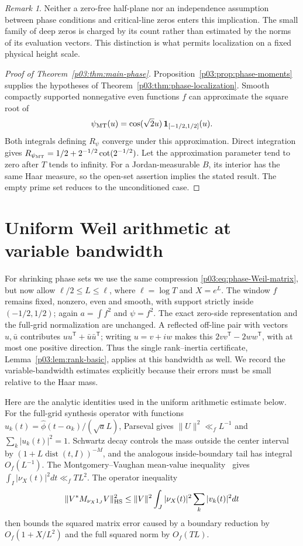 \documentclass[11pt,letterpaper]{article}
\theoremstyle{definition}
\theoremstyle{remark}
\newtheorem{remark}[theorem]{Remark}
\newcommand{\1}{\mathbf 1}
\begin{document}
\begin{remark}
Neither a zero-free half-plane nor an independence assumption between
phase conditions and critical-line zeros enters this implication.
The small family of deep zeros is charged by its count rather than
estimated by the norms of its evaluation vectors.  This distinction
is what permits localization on a fixed physical height scale.
\end{remark}

\begin{proof}[Proof of Theorem~\ref{p03:thm:main-phase}]
Proposition~\ref{p03:prop:phase-moments} supplies the hypotheses of
Theorem~\ref{p03:thm:phase-localization}. Smooth compactly supported
nonnegative even functions $f$ can approximate the square root of
\[
 \psi_{\rm MT}(u)=\cos(\sqrt2u)\,\mathbf1_{[-1/2,1/2]}(u).
\]
Both integrals defining $R_\psi$ converge under this approximation.
Direct integration gives
$R_{\psi_{\rm MT}}=1/2+2^{-1/2}\cot(2^{-1/2})$.
Let the approximation parameter tend to zero after $T$ tends to
infinity. For a Jordan-measurable $B$, its interior has the same
Haar measure, so the open-set assertion implies the stated result.
The empty prime set reduces to the unconditioned case.
\end{proof}




\section{Uniform Weil arithmetic at variable bandwidth}
\label{p04:sec:basic-Weil}

For shrinking phase sets we use the same compression
\eqref{p03:eq:phase-Weil-matrix}, but now allow
$\ell/2\le L\le\ell$, where $\ell=\log T$ and $X=e^L$.
The window $f$ remains fixed, nonzero, even and smooth, with support
strictly inside $(-1/2,1/2)$; again $a=\int f^2$ and $\psi=f^2$.
The exact zero-side representation and the full-grid normalization
are unchanged. A reflected off-line pair with vectors $u,\bar u$
contributes $uu^{\mathsf T}+\bar u\bar u^{\mathsf T}$; writing
$u=v+iw$ makes this $2vv^{\mathsf T}-2ww^{\mathsf T}$, with at
most one positive direction. Thus the single rank--inertia
certificate, Lemma~\ref{p03:lem:rank-basic}, applies at this bandwidth
as well. We record the variable-bandwidth estimates explicitly
because their errors must be small relative to the Haar mass.

Here are the analytic identities used in the uniform arithmetic
estimate below. For the full-grid synthesis operator with functions
$u_k(t)=\widehat\phi(t-\alpha_k)/(\sqrt a L)$, Parseval gives
$\|U\|^2\ll_f L^{-1}$ and $\sum_k|u_k(t)|^2=1$.
Schwartz decay controls the mass outside the center interval by
$(1+L\operatorname{dist}(t,I))^{-M}$, and the analogous
inside-boundary tail has integral $O_f(L^{-1})$.
The Montgomery--Vaughan mean-value inequality~\cite{Hilbert} gives
$\int_I|\nu_X(t)|^2dt\ll_f TL^2$.
The operator inequality
\[
 \|V^*M_{\nu_X1_J}V\|_{\rm HS}^2
 \le\|V\|^2\int_J|\nu_X(t)|^2\sum_k|v_k(t)|^2dt
\]
then bounds the squared matrix error caused by a boundary reduction
by $O_f(1+X/L^2)$ and the full squared norm by $O_f(TL)$.
\end{document}
